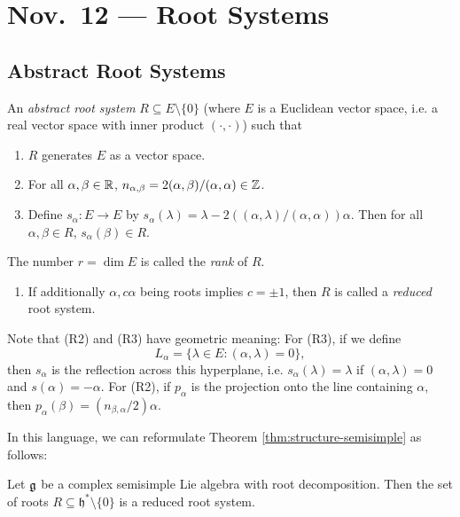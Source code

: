 \chapter{Nov.~12 --- Root Systems}

\section{Abstract Root Systems}

\begin{definition}
  An \emph{abstract root system}
  $R \subseteq E \setminus \{0\}$
  (where $E$ is a Euclidean vector space,
  i.e. a real vector space with inner
  product $(\cdot, \cdot)$) such that
  \begin{enumerate}[(R1)]
    \item $R$ generates $E$ as a
      vector space.
    \item For all $\alpha, \beta \in \mathbb{R}$,
      $n_{\alpha, \beta} = 2(\alpha, \beta) /
      (\alpha, \alpha) \in \mathbb{Z}$.
    \item Define
      $s_{\alpha} : E \to E$ by
      $s_\alpha(\lambda) = \lambda - 2((\alpha, \lambda) / (\alpha, \alpha)) \alpha$.
      Then for all $\alpha, \beta \in R$,
      $s_\alpha(\beta) \in R$.
  \end{enumerate}
  The number $r = \dim E$ is called
  the \emph{rank} of $R$.
  \begin{enumerate}
    \item[(R4)] If additionally
      $\alpha, c \alpha$ being
      roots implies $c = \pm 1$, then
      $R$ is called a \emph{reduced} root
      system.
  \end{enumerate}
\end{definition}

\begin{remark}
  Note that (R2) and (R3)
  have geometric meaning: For (R3), if we
  define
  \[L_\alpha = \{\lambda \in E : (\alpha, \lambda) = 0\},\]
  then $s_\alpha$ is the reflection
  across this hyperplane, i.e.
  $s_\alpha(\lambda) = \lambda$ if
  $(\alpha, \lambda) = 0$ and
  $s(\alpha) = -\alpha$. For (R2),
  if $p_\alpha$ is the projection onto
  the line containing $\alpha$, then
  $p_\alpha(\beta) = (n_{\beta, \alpha} / 2) \alpha$.

  In this language, we can reformulate
  Theorem \ref{thm:structure-semisimple} as follows:
\end{remark}

\begin{theorem}
  Let $\mathfrak{g}$ be a complex
  semisimple Lie algebra with
  root decomposition. Then the set of
  roots $R \subseteq \mathfrak{h}^* \setminus \{0\}$
  is a reduced root system.
\end{theorem}


